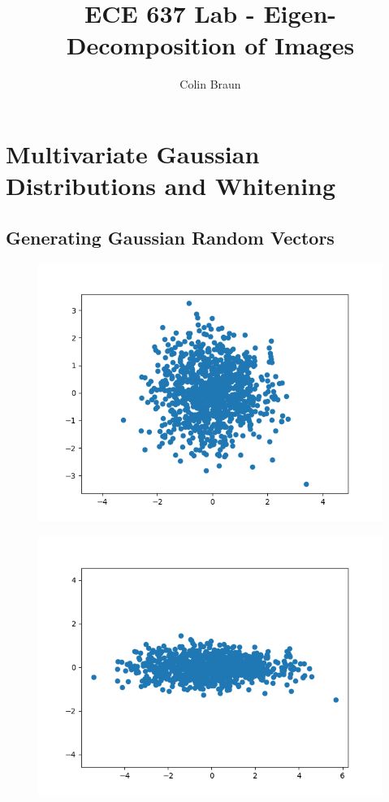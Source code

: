 \documentclass{article}
\title{ECE 637 Lab - Eigen-Decomposition of Images}
\author{Colin Braun}
\begin{document}
\maketitle

\section{Multivariate Gaussian Distributions and Whitening}
\subsection{Generating Gaussian Random Vectors}
\begin{figure}[H]
    \centering
    \includegraphics[width=1\textwidth]{../w-2-1.png}
        \end{figure}
\begin{figure}[H]
    \centering
    \includegraphics[width=1\textwidth]{../x-tilde-2-1.png}
        \end{figure}
\end{document}
